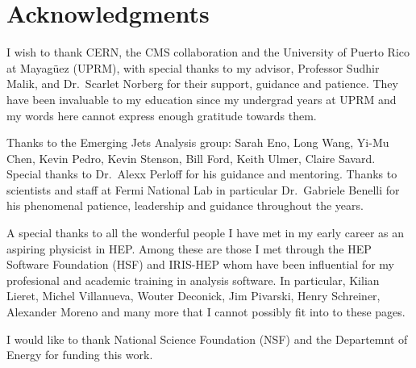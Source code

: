 \chapter*{Acknowledgments}


I wish to thank CERN, the CMS collaboration and the University of Puerto Rico at Mayagüez (UPRM), with special thanks to my advisor, Professor Sudhir Malik, and Dr.~Scarlet Norberg for their support, guidance and patience. They have been invaluable to my education since my undergrad years at UPRM and my words here cannot express enough gratitude towards them.

Thanks to the Emerging Jets Analysis group: Sarah Eno, Long Wang, Yi-Mu Chen, Kevin Pedro, Kevin Stenson, Bill Ford, Keith Ulmer, Claire Savard. Special thanks to Dr.~Alexx Perloff for his guidance and mentoring. Thanks to scientists and staff at Fermi National Lab in particular Dr.~Gabriele Benelli for his phenomenal patience, leadership and guidance throughout the years. 

A special thanks to all the wonderful people I have met in my early career as an aspiring physicist in HEP. Among these are those I met through the HEP Software Foundation (HSF) and IRIS-HEP whom have been influential for my profesional and academic training in analysis software. In particular, Kilian Lieret, Michel Villanueva, Wouter Deconick, Jim Pivarski, Henry Schreiner, Alexander Moreno and many more that I cannot possibly fit into to these pages.

I would like to thank National Science Foundation (NSF) and the Departemnt of Energy for funding this work.